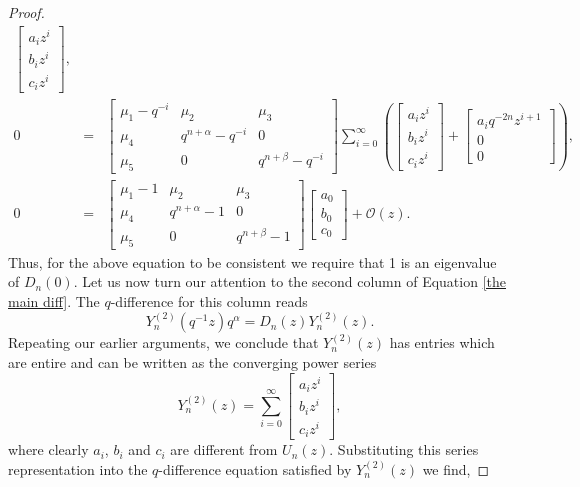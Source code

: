 \documentclass[10pt,a4paper]{amsart}
\begin{document}
\begin{proof}
\begin{eqnarray*}
\begin{bmatrix}
   a_i z^i\\
   b_i z^i\\
    c_i z^i
 \end{bmatrix},\\
 0
 &=& \begin{bmatrix}
    \mu_{1}-q^{-i} & \mu_{2} &\mu_{3}\\
   \mu_{4}&q^{n+\alpha}-q^{-i}&0 \\
   \mu_{5}&0&q^{n+\beta}-q^{-i}
   \end{bmatrix}\sum_{i=0}^\infty\left(\begin{bmatrix}
   a_i z^i\\
   b_i z^i\\
    c_i z^i
 \end{bmatrix}+ \begin{bmatrix}
   a_i q^{-2n}z^{i+1}\\
   0\\
    0
 \end{bmatrix}\right),\\
  0
 &=& \begin{bmatrix}
    \mu_{1}-1 & \mu_{2} &\mu_{3}\\
   \mu_{4}&q^{n+\alpha}-1&0 \\
   \mu_{5}&0&q^{n+\beta}-1
   \end{bmatrix} \begin{bmatrix}
   a_0 \\
   b_0 \\
    c_0 
 \end{bmatrix}+ \mathcal{O}(z).
\end{eqnarray*}
Thus, for the above equation to be consistent we require that 1 is an eigenvalue of $D_n(0)$. Let us now turn our attention to the second column of Equation \eqref{the main diff}. The $q$-difference for this column reads
\[ Y_n^{(2)}(q^{-1}z)q^\alpha = D_n(z)Y_n^{(2)}(z).\]
Repeating our earlier arguments, we conclude that $Y_n^{(2)}(z)$ has entries which are entire and can be written as the converging power series
\begin{equation}
    Y_n^{(2)}(z) =  \sum_{i=0}^\infty\begin{bmatrix}
   a_i z^i\\
   b_i z^i\\
    c_i z^i
\end{bmatrix},
\end{equation}
where clearly $a_i$, $b_i$ and $c_i$ are different from $U_n(z)$. Substituting this series representation into the $q$-difference equation satisfied by $Y_n^{(2)}(z)$ we find,

\end{proof}
\end{document}
